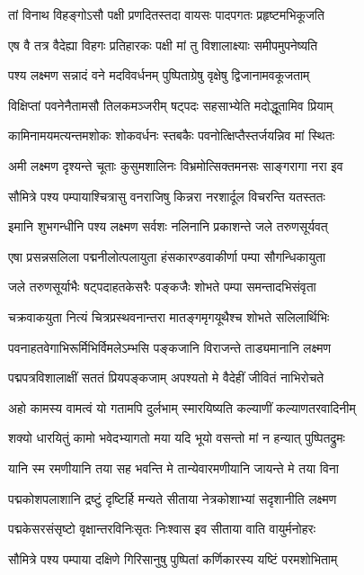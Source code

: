 \twolineshloka
{तां विनाथ विहङ्गोऽसौ पक्षी प्रणदितस्तदा}
{वायसः पादपगतः प्रहृष्टमभिकूजति} %

\twolineshloka
{एष वै तत्र वैदेह्या विहगः प्रतिहारकः}
{पक्षी मां तु विशालाक्ष्याः समीपमुपनेष्यति} %

\twolineshloka
{पश्य लक्ष्मण सन्नादं वने मदविवर्धनम्}
{पुष्पिताग्रेषु वृक्षेषु द्विजानामवकूजताम्} %

\twolineshloka
{विक्षिप्तां पवनेनैतामसौ तिलकमञ्जरीम्}
{षट्पदः सहसाभ्येति मदोद्धूतामिव प्रियाम्} %

\twolineshloka
{कामिनामयमत्यन्तमशोकः शोकवर्धनः}
{स्तबकैः पवनोत्क्षिप्तैस्तर्जयन्निव मां स्थितः} %

\twolineshloka
{अमी लक्ष्मण दृश्यन्ते चूताः कुसुमशालिनः}
{विभ्रमोत्सिक्तमनसः साङ्गरागा नरा इव} %

\twolineshloka
{सौमित्रे पश्य पम्पायाश्चित्रासु वनराजिषु}
{किन्नरा नरशार्दूल विचरन्ति यतस्ततः} %

\twolineshloka
{इमानि शुभगन्धीनि पश्य लक्ष्मण सर्वशः}
{नलिनानि प्रकाशन्ते जले तरुणसूर्यवत्} %

\twolineshloka
{एषा प्रसन्नसलिला पद्मनीलोत्पलायुता}
{हंसकारण्डवाकीर्णा पम्पा सौगन्धिकायुता} %

\twolineshloka
{जले तरुणसूर्याभैः षट्पदाहतकेसरैः}
{पङ्कजैः शोभते पम्पा समन्तादभिसंवृता} %

\twolineshloka
{चक्रवाकयुता नित्यं चित्रप्रस्थवनान्तरा}
{मातङ्गमृगयूथैश्च शोभते सलिलार्थिभिः} %

\twolineshloka
{पवनाहतवेगाभिरूर्मिभिर्विमलेऽम्भसि}
{पङ्कजानि विराजन्ते ताड्यमानानि लक्ष्मण} %

\twolineshloka
{पद्मपत्रविशालाक्षीं सततं प्रियपङ्कजाम्}
{अपश्यतो मे वैदेहीं जीवितं नाभिरोचते} %

\twolineshloka
{अहो कामस्य वामत्वं यो गतामपि दुर्लभाम्}
{स्मारयिष्यति कल्याणीं कल्याणतरवादिनीम्} %

\twolineshloka
{शक्यो धारयितुं कामो भवेदभ्यागतो मया}
{यदि भूयो वसन्तो मां न हन्यात् पुष्पितद्रुमः} %

\twolineshloka
{यानि स्म रमणीयानि तया सह भवन्ति मे}
{तान्येवारमणीयानि जायन्ते मे तया विना} %

\twolineshloka
{पद्मकोशपलाशानि द्रष्टुं दृष्टिर्हि मन्यते}
{सीताया नेत्रकोशाभ्यां सदृशानीति लक्ष्मण} %

\twolineshloka
{पद्मकेसरसंसृष्टो वृक्षान्तरविनिःसृतः}
{निःश्वास इव सीताया वाति वायुर्मनोहरः} %

\twolineshloka
{सौमित्रे पश्य पम्पाया दक्षिणे गिरिसानुषु}
{पुष्पितां कर्णिकारस्य यष्टिं परमशोभिताम्} %

